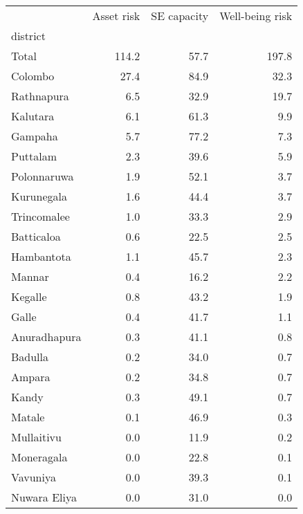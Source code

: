\begin{tabular}{lrrr}
\toprule
{} &  Asset risk &  SE capacity &  Well-being risk \\
district     &             &              &                  \\
\midrule
Total        &       114.2 &         57.7 &            197.8 \\
Colombo      &        27.4 &         84.9 &             32.3 \\
Rathnapura   &         6.5 &         32.9 &             19.7 \\
Kalutara     &         6.1 &         61.3 &              9.9 \\
Gampaha      &         5.7 &         77.2 &              7.3 \\
Puttalam     &         2.3 &         39.6 &              5.9 \\
Polonnaruwa  &         1.9 &         52.1 &              3.7 \\
Kurunegala   &         1.6 &         44.4 &              3.7 \\
Trincomalee  &         1.0 &         33.3 &              2.9 \\
Batticaloa   &         0.6 &         22.5 &              2.5 \\
Hambantota   &         1.1 &         45.7 &              2.3 \\
Mannar       &         0.4 &         16.2 &              2.2 \\
Kegalle      &         0.8 &         43.2 &              1.9 \\
Galle        &         0.4 &         41.7 &              1.1 \\
Anuradhapura &         0.3 &         41.1 &              0.8 \\
Badulla      &         0.2 &         34.0 &              0.7 \\
Ampara       &         0.2 &         34.8 &              0.7 \\
Kandy        &         0.3 &         49.1 &              0.7 \\
Matale       &         0.1 &         46.9 &              0.3 \\
Mullaitivu   &         0.0 &         11.9 &              0.2 \\
Moneragala   &         0.0 &         22.8 &              0.1 \\
Vavuniya     &         0.0 &         39.3 &              0.1 \\
Nuwara Eliya &         0.0 &         31.0 &              0.0 \\
\bottomrule
\end{tabular}
